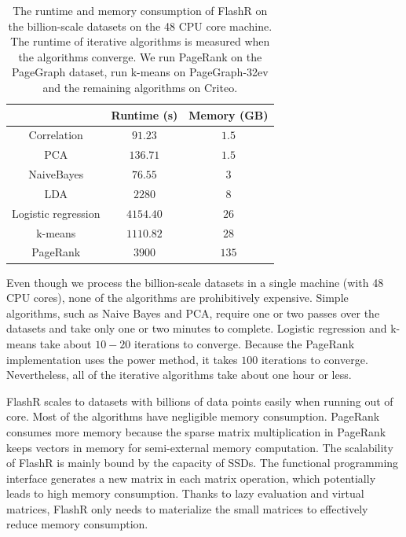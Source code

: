 \documentclass[simplex.tex]{subfiles}
\begin{document}
\begin{table}[h!]
\begin{center}
\caption{The runtime and memory consumption of FlashR on the billion-scale
		datasets on the 48 CPU core machine. The runtime of iterative
		algorithms is measured when the algorithms converge. We run PageRank
		on the PageGraph dataset, run k-means on PageGraph-32ev and the remaining
		algorithms on Criteo.}
\vspace{-10pt}
\footnotesize
\begin{tabular}{|c|c|c|}
\hline
& Runtime (s) & Memory (GB) \\
\hline
Correlation & $91.23$ & $1.5$ \\
\hline
PCA & $136.71$ & $1.5$ \\
\hline
NaiveBayes & $76.55$ & $3$ \\
\hline
LDA & $2280$ & $8$ \\
\hline
Logistic regression & $4154.40$ & $26$ \\
\hline
k-means & $1110.82$ & $28$ \\
\hline
PageRank & $3900$ & $135$ \\
\hline
\end{tabular}
\normalsize
\label{tbl:scale}
\end{center}
\vspace{-10pt}
\end{table}

Even though we process the billion-scale datasets in a single machine (with
48 CPU cores), none of
the algorithms are prohibitively expensive. Simple algorithms, such as
Naive Bayes and PCA, require one or two passes over the datasets and take
only one or two minutes to complete. Logistic regression and k-means take
about $10-20$ iterations to converge. Because the PageRank implementation
uses the power method, it takes $100$ iterations to converge.
Nevertheless, all of the iterative algorithms take about one hour or less.

FlashR scales to datasets with billions of data points easily when running
out of core. Most of the algorithms have negligible memory consumption.
PageRank consumes more memory because the sparse matrix multiplication in
PageRank keeps vectors in memory for semi-external memory computation.
The scalability of FlashR is mainly bound by the capacity of SSDs.
The functional programming
interface generates a new matrix in each matrix operation, which potentially
leads to high memory consumption. Thanks to lazy evaluation and virtual matrices,
FlashR only needs to materialize the small matrices to effectively reduce
memory consumption.
\end{document}
